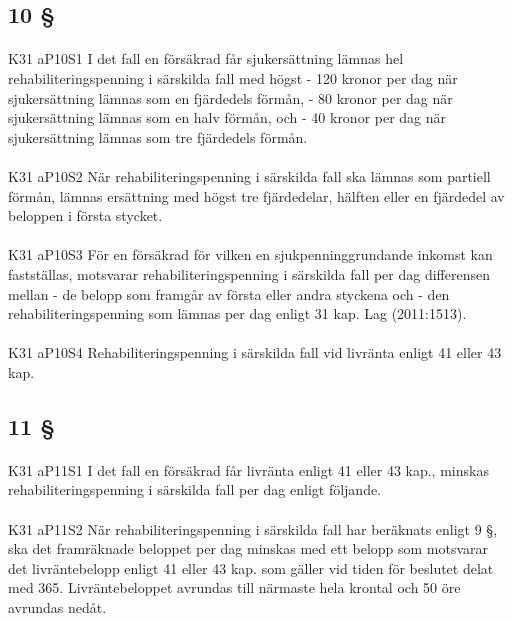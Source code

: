 \documentclass[a4paper,notitlepage,openany,10pt]{book}
\begin{document}
\subsection*{10 §}
\paragraph*{}
{\tiny K31 aP10S1}
I det fall en försäkrad får sjukersättning lämnas hel rehabiliteringspenning i särskilda fall med högst
\newline - 120 kronor per dag när sjukersättning lämnas som en fjärdedels förmån,
\newline - 80 kronor per dag när sjukersättning lämnas som en halv förmån, och
\newline - 40 kronor per dag när sjukersättning lämnas som tre fjärdedels förmån.
\paragraph*{}
{\tiny K31 aP10S2}
När rehabiliteringspenning i särskilda fall ska lämnas som partiell förmån, lämnas ersättning med högst tre fjärdedelar, hälften eller en fjärdedel av beloppen i första stycket.
\paragraph*{}
{\tiny K31 aP10S3}
För en försäkrad för vilken en sjukpenninggrundande inkomst kan fastställas, motsvarar rehabiliteringspenning i särskilda fall per dag differensen mellan
\newline - de belopp som framgår av första eller andra styckena och
\newline - den rehabiliteringspenning som lämnas per dag enligt 31 kap.
Lag (2011:1513).
\paragraph*{}
{\tiny K31 aP10S4}
Rehabiliteringspenning i särskilda fall vid livränta enligt 41 eller 43 kap.
\subsection*{11 §}
\paragraph*{}
{\tiny K31 aP11S1}
I det fall en försäkrad får livränta enligt 41 eller 43 kap., minskas rehabiliteringspenning i särskilda fall per dag enligt följande.
\paragraph*{}
{\tiny K31 aP11S2}
När rehabiliteringspenning i särskilda fall har beräknats enligt 9 §, ska det framräknade beloppet per dag minskas med ett belopp som motsvarar det livräntebelopp enligt 41 eller 43 kap. som gäller vid tiden för beslutet delat med 365.
Livräntebeloppet avrundas till närmaste hela krontal och 50 öre avrundas nedåt.
\end{document}
